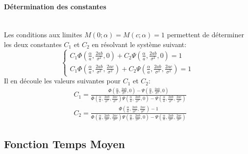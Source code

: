 \paragraph{Détermination des constantes}\phantom{}\\
Les conditions aux limites $M(0;\alpha)=M(c;\alpha)=1$ permettent de déterminer les deux constantes $C_1$ et $C_2$ en résolvant le système suivant:
\[
\begin{cases}
    C_1\Phi\left(\frac{\alpha}{a}, \frac{2ab}{\sigma^2}, 0\right) + C_2\Psi\left(\frac{\alpha}{a}, \frac{2ab}{\sigma^2}, 0\right) = 1 \\
C_1\Phi\left(\frac{\alpha}{a}, \frac{2ab}{\sigma^2}, \frac{2ac}{\sigma^2}\right) + C_2\Psi\left(\frac{\alpha}{a}, \frac{2ab}{\sigma^2}, \frac{2ac}{\sigma^2}\right) = 1
\end{cases}
\]
Il en découle les valeurs suivantes pour $C_1$ et $C_2$: 
\begin{equation}\label{fgm_constants}
    \begin{aligned}
        &C_1 = \frac{\Phi(\frac{\alpha}{a}, \frac{2ab}{\sigma^2}, 0)-\Psi(\frac{\alpha}{a}, \frac{2ab}{\sigma^2}, 0)}{\Phi(\frac{\alpha}{a}, \frac{2ab}{\sigma^2}, \frac{2ac}{\sigma^2})\Psi(\frac{\alpha}{a}, \frac{2ab}{\sigma^2}, 0)-\Psi(\frac{\alpha}{a}, \frac{2ab}{\sigma^2}, \frac{2ac}{\sigma^2})} \\
        &C_2 = \frac{\Phi(\frac{\alpha}{a}, \frac{2ab}{\sigma^2}, \frac{2ac}{\sigma^2})-1}{\Phi(\frac{\alpha}{a}, \frac{2ab}{\sigma^2}, \frac{2ac}{\sigma^2})\Psi(\frac{\alpha}{a}, \frac{2ab}{\sigma^2}, 0)-\Psi(\frac{\alpha}{a}, \frac{2ab}{\sigma^2}, \frac{2ac}{\sigma^2})}
    \end{aligned}
\end{equation}

\subsection{Fonction Temps Moyen}\label{subsection_mean_eq}

